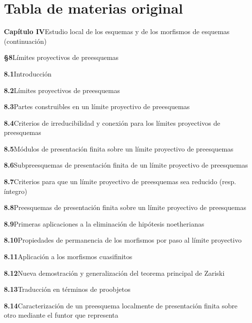 \endgroup

\clearpage
{}
{}
\section*{Tabla de materias original}

\begingroup
\small
\newcommand{\EGAIVthreeContents}[3]{\textbf{#1}\quad #2\dotfill #3\par}

\EGAIVthreeContents{Capítulo IV}{Estudio local de los esquemas y de los morfismos de esquemas (continuación)}{5}
\EGAIVthreeContents{§8}{Límites proyectivos de preesquemas}{5}
\EGAIVthreeContents{8.1}{Introducción}{5}
\EGAIVthreeContents{8.2}{Límites proyectivos de preesquemas}{7}
\EGAIVthreeContents{8.3}{Partes construibles en un límite proyectivo de preesquemas}{12}
\EGAIVthreeContents{8.4}{Criterios de irreducibilidad y conexión para los límites proyectivos de preesquemas}{17}
\EGAIVthreeContents{8.5}{Módulos de presentación finita sobre un límite proyectivo de preesquemas}{19}
\EGAIVthreeContents{8.6}{Subpreesquemas de presentación finita de un límite proyectivo de preesquemas}{25}
\EGAIVthreeContents{8.7}{Criterios para que un límite proyectivo de preesquemas sea reducido (resp. íntegro)}{27}
\EGAIVthreeContents{8.8}{Preesquemas de presentación finita sobre un límite proyectivo de preesquemas}{28}
\EGAIVthreeContents{8.9}{Primeras aplicaciones a la eliminación de hipótesis noetherianas}{34}
\EGAIVthreeContents{8.10}{Propiedades de permanencia de los morfismos por paso al límite proyectivo}{36}
\EGAIVthreeContents{8.11}{Aplicación a los morfismos cuasifinitos}{41}
\EGAIVthreeContents{8.12}{Nueva demostración y generalización del teorema principal de Zariski}{43}
\EGAIVthreeContents{8.13}{Traducción en términos de proobjetos}{49}
\EGAIVthreeContents{8.14}{Caracterización de un preesquema localmente de presentación finita sobre otro mediante el funtor que representa}{52}

